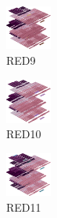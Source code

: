 \hspace{0.1cm}
\begin{minipage}[b]{0.15\linewidth}
\begin{figure}[H]                                                          
  \centering                                                             
  \begin{adjustbox}{width=1.5cm,center}                                   
  \includegraphics[width=1.5cm]{src/colorspace_colourflow/flows/colourflow_73-45.png}%
  \end{adjustbox}                                                        
\caption*{RED9}                                           
\end{figure}                                                               
\end{minipage}
\hspace{0.1cm}
\begin{minipage}[b]{0.15\linewidth}
\begin{figure}[H]                                                          
  \centering                                                             
  \begin{adjustbox}{width=1.5cm,center}                                   
  \includegraphics[width=1.5cm]{src/colorspace_colourflow/flows/colourflow_74-45.png}%
  \end{adjustbox}                                                        
\caption*{RED10}                                           
\end{figure}                                                               
\end{minipage}
\hspace{0.1cm}
\begin{minipage}[b]{0.15\linewidth}
\begin{figure}[H]                                                          
  \centering                                                             
  \begin{adjustbox}{width=1.5cm,center}                                   
  \includegraphics[width=1.5cm]{src/colorspace_colourflow/flows/colourflow_75-45.png}%
  \end{adjustbox}                                                        
\caption*{RED11}                                           
\end{figure}                                                               
\end{minipage}
